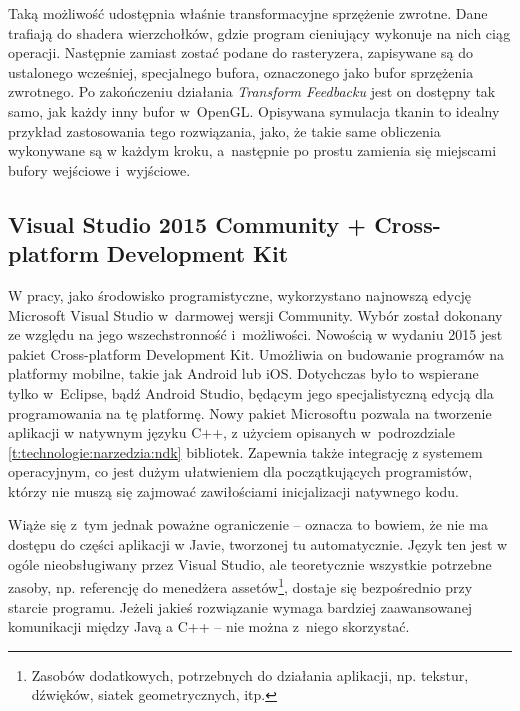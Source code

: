 			Taką możliwość udostępnia właśnie transformacyjne sprzężenie zwrotne. Dane trafiają do shadera wierzchołków, gdzie program cieniujący wykonuje na nich ciąg operacji. Następnie zamiast zostać podane do rasteryzera, zapisywane są do ustalonego wcześniej, specjalnego bufora, oznaczonego jako bufor sprzężenia zwrotnego. Po zakończeniu działania \emph{Transform Feedbacku} jest on dostępny tak samo, jak każdy inny bufor w~OpenGL. Opisywana symulacja tkanin to idealny przykład zastosowania tego rozwiązania, jako, że takie same obliczenia wykonywane są w każdym kroku, a~następnie po prostu zamienia się miejscami bufory wejściowe i~wyjściowe. 
		
		
		\subsection{Visual Studio 2015 Community + Cross-platform Development Kit}
		\label{t:technologie:narzedzia:vs}
		
		
		W pracy, jako środowisko programistyczne, wykorzystano najnowszą edycję Microsoft Visual Studio w~darmowej wersji Community. Wybór został dokonany ze względu na jego wszechstronność i~możliwości. Nowością w wydaniu 2015 jest pakiet Cross-platform Development Kit. Umożliwia on budowanie programów na platformy mobilne, takie jak Android lub iOS. Dotychczas było to wspierane tylko w~Eclipse, bądź Android Studio, będącym jego specjalistyczną edycją dla programowania na tę platformę. Nowy pakiet Microsoftu pozwala na tworzenie aplikacji w natywnym języku C++, z użyciem opisanych w~podrozdziale \ref{t:technologie:narzedzia:ndk} bibliotek. Zapewnia także integrację z systemem operacyjnym, co jest dużym ułatwieniem dla początkujących programistów, którzy nie muszą się zajmować zawiłościami inicjalizacji natywnego kodu. 
		
		Wiąże się z~tym jednak poważne ograniczenie -- oznacza to bowiem, że nie ma dostępu do części aplikacji w Javie, tworzonej tu automatycznie. Język ten jest w ogóle nieobsługiwany przez Visual Studio, ale teoretycznie wszystkie potrzebne zasoby, np. referencję do menedżera assetów\footnote{Zasobów dodatkowych, potrzebnych do działania aplikacji, np. tekstur, dźwięków, siatek geometrycznych, itp.}, dostaje się bezpośrednio przy starcie programu. Jeżeli jakieś rozwiązanie wymaga bardziej zaawansowanej komunikacji między Javą a C++ -- nie można z~niego skorzystać.
		
